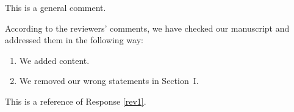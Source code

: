 \editor
\begin{generalcomment}
	This is a general comment.
\end{generalcomment}

\begin{revmeta}\label{rev1}
	According to the reviewers' comments, we have checked our manuscript and addressed them in the following way:
	\begin{enumerate}
		\item We added content.
		\item We removed our wrong statements in Section~I.
	\end{enumerate}
\end{revmeta}

\begin{revmeta}
	This is a reference of Response \ref{rev1}.
\end{revmeta}
